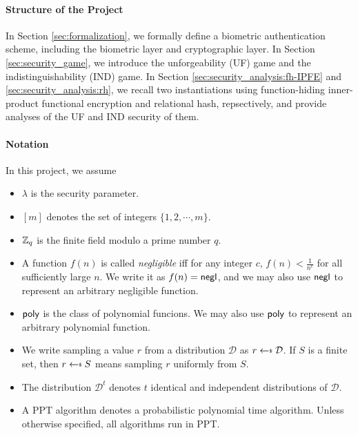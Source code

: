 \paragraph{Structure of the Project}
In Section \ref{sec:formalization}, we formally define a biometric authentication scheme, including the biometric layer and cryptographic layer. 
In Section \ref{sec:security_game}, we introduce the unforgeability (UF) game and the indistinguishability (IND) game. 
In Section \ref{sec:security_analysis:fh-IPFE} and \ref{sec:security_analysis:rh}, we recall two instantiations using function-hiding inner-product functional encryption and relational hash, repsectively, and provide analyses of the UF and IND security of them.

\paragraph{Notation}
In this project, we assume

\begin{itemize}
	
	\item $\lambda$ is the security parameter.

	\item $[m]$ denotes the set of integers $\{1, 2, \cdots, m\}$.

	\item $\mathbb{Z}_q$ is the finite field modulo a prime number $q$.

	\item A function $f(n)$ is called \emph{negligible} iff for any integer $c$, $f(n) < \frac{1}{n^c}$ for all sufficiently large $n$. We write it as $f(n) = \mathsf{negl}$, and we may also use $\mathsf{negl}$ to represent an arbitrary negligible function.
	
	\item $\mathsf{poly}$ is the class of polynomial funcions. We may also use $\mathsf{poly}$ to represent an arbitrary polynomial function.
	
	\item We write sampling a value $r$ from a distribution $\mathcal{D}$ as $r \getsdollar \mathcal{D}$. If $S$ is a finite set, then $r \getsdollar S$ means sampling $r$ uniformly from $S$.

	\item The distribution $\mathcal{D}^t$ denotes $t$ identical and independent distributions of $\mathcal{D}$.

	\item A PPT algorithm denotes a probabilistic polynomial time algorithm. Unless otherwise specified, all algorithms run in PPT.

\end{itemize}


